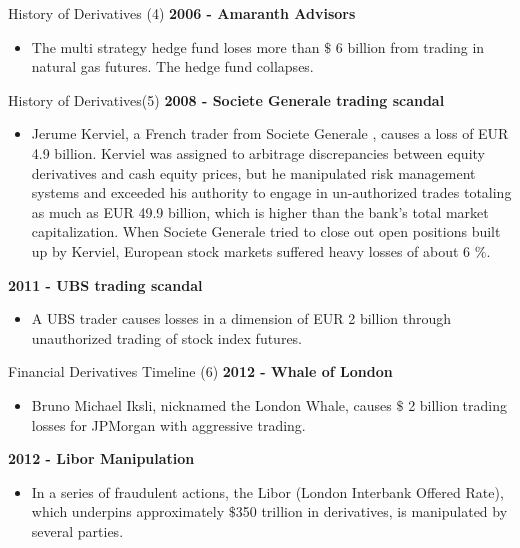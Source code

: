 {History of Derivatives (4)}
\textbf{2006 - Amaranth Advisors}
\begin{itemize}
  \item The multi strategy hedge fund loses more than $\$$ 6 billion from trading in natural gas futures. The hedge fund collapses.
\end{itemize}


{History of Derivatives(5)}
\textbf{2008 - Societe Generale trading scandal}
\begin{itemize}
  \item Jerume Kerviel, a French trader from Societe Generale , causes a loss of EUR 4.9 billion. Kerviel was assigned to arbitrage discrepancies between equity derivatives and cash equity prices, but he manipulated risk management systems and exceeded his authority to engage in un-authorized trades totaling as much as EUR 49.9 billion, which is higher than the bank's total market capitalization. When Societe Generale  tried to close out open positions built up by Kerviel, European stock markets suffered heavy losses of about 6 $\%$.
\end{itemize}
\textbf{2011 - UBS trading scandal}
\begin{itemize}
  \item A UBS trader causes losses in a dimension of EUR 2 billion through unauthorized trading of stock index futures.
\end{itemize}


{Financial Derivatives Timeline (6)}
\textbf{2012 - Whale of London}
\begin{itemize}
  \item Bruno Michael Iksli, nicknamed the London Whale, causes $\$$ 2 billion trading losses for JPMorgan with aggressive trading.
\end{itemize}
\textbf{2012 - Libor Manipulation}
\begin{itemize}
\item In a series of fraudulent actions, the Libor (London Interbank Offered Rate), which underpins approximately $\$$350 trillion in derivatives, is manipulated by several parties.
\end{itemize}


